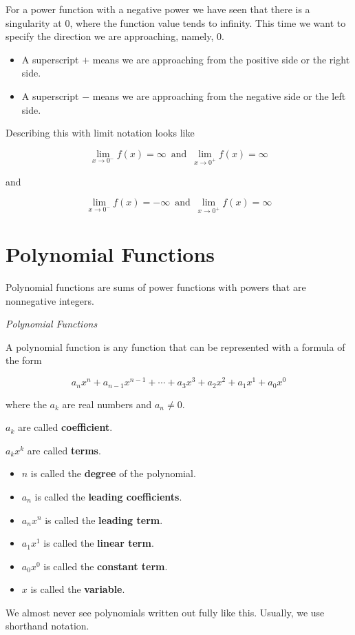 \documentclass{ximera}
\begin{document}
For a power function with a negative power we have seen that there is a singularity at $0$, where the function value tends to infinity.  This time we want to specify the direction we are approaching, namely, $0$.  

\begin{itemize}
\item A superscript $+$ means we are approaching from the positive side or the right side.
\item A superscript $-$ means we are approaching from the negative side or the left side.
\end{itemize}


Describing this with limit notation looks like




\[    \lim_{x \to 0^-} f(x) =  \infty  \,   \text{ and }  \,     \lim_{x \to 0^+} f(x) = \infty      \]


and 

\[    \lim_{x \to 0^-} f(x) =  -\infty  \,   \text{ and }  \,     \lim_{x \to 0^+} f(x) = \infty      \]









\section{Polynomial Functions}


Polynomial functions are sums of power functions with powers that are nonnegative integers.


\begin{definition} \textit{Polynomial Functions}

A polynomial function is any function that can be represented with a formula of the form

\[    a_n x^n + a_{n-1} x^{n-1} + \cdots + a_3 x^3 + a_2 x^2 + a_1 x^1 + a_0 x^0      \]

where the $a_k$ are real numbers and $a_n \ne 0$.

$a_k$ are called \textbf{coefficient}.

$a_k x^k$ are called \textbf{terms}.



\begin{itemize}
\item $n$ is called the \textbf{degree} of the polynomial.
\item $a_n$ is called the \textbf{leading coefficients}.
\item $a_n x^n$ is called the \textbf{leading term}.
\item $a_1 x^1$ is called the \textbf{linear term}.
\item $a_0 x^0$ is called the \textbf{constant term}.
\item $x$ is called the \textbf{variable}.
\end{itemize}


\end{definition}
We almost never see polynomials written out fully like this.  Usually, we use shorthand notation.\\
\end{document}
